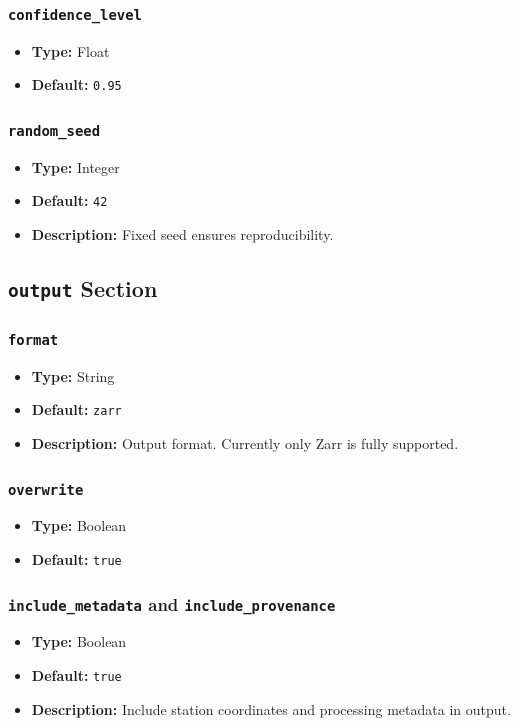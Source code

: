 \documentclass[12pt,a4paper]{article}
\begin{document}
\subsubsection{\texttt{confidence\_level}}
\begin{itemize}[leftmargin=*]
    \item \textbf{Type:} Float
    \item \textbf{Default:} \texttt{0.95}
\end{itemize}
\subsubsection{\texttt{random\_seed}}
\begin{itemize}[leftmargin=*]
    \item \textbf{Type:} Integer
    \item \textbf{Default:} \texttt{42}
    \item \textbf{Description:} Fixed seed ensures reproducibility.
\end{itemize}

\subsection{\texttt{output} Section}
\subsubsection{\texttt{format}}
\begin{itemize}[leftmargin=*]
    \item \textbf{Type:} String
    \item \textbf{Default:} \texttt{zarr}
    \item \textbf{Description:} Output format. Currently only Zarr is fully supported.
\end{itemize}
\subsubsection{\texttt{overwrite}}
\begin{itemize}[leftmargin=*]
    \item \textbf{Type:} Boolean
    \item \textbf{Default:} \texttt{true}
\end{itemize}
\subsubsection{\texttt{include\_metadata} and \texttt{include\_provenance}}
\begin{itemize}[leftmargin=*]
    \item \textbf{Type:} Boolean
    \item \textbf{Default:} \texttt{true}
    \item \textbf{Description:} Include station coordinates and processing metadata in output.
\end{itemize}
\end{document}
